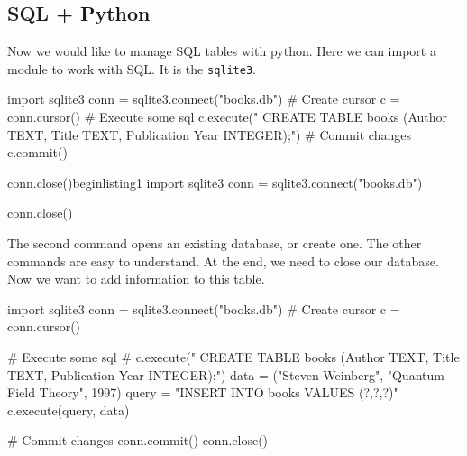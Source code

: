 \subsection{SQL + Python}

Now we would like to manage SQL tables with python. Here we can import a module to work with 
SQL. It is the \verb|sqlite3|. 
\begin{listing}{1}
import sqlite3
conn = sqlite3.connect("books.db")
# Create cursor
c = conn.cursor()
# Execute some sql
c.execute(" CREATE TABLE books (Author TEXT, Title TEXT, Publication Year INTEGER);")
# Commit changes
c.commit()

conn.close()begin{listing}{1}
import sqlite3 
conn = sqlite3.connect("books.db")

conn.close()
\end{listing}
The second command opens an existing database, or create one. The other commands are easy to understand. 
At the end, we need to close our database. Now we want to add information to this table.
\begin{listing}{1}
import sqlite3
conn = sqlite3.connect("books.db")
# Create cursor
c = conn.cursor()

# Execute some sql
# c.execute(" CREATE TABLE books (Author TEXT, Title TEXT, Publication Year INTEGER);")
data = ("Steven Weinberg", "Quantum Field Theory", 1997)
query = "INSERT INTO books VALUES (?,?,?)"
c.execute(query, data)

# Commit changes
conn.commit()
conn.close()
\end{listing}